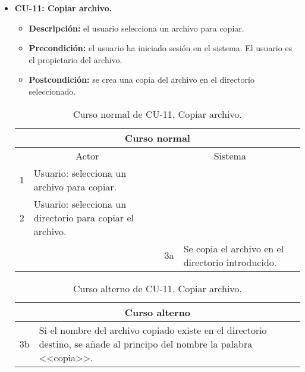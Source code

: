 \begin{itemize}
	\item \textbf{CU-11: Copiar archivo.}
	\begin{itemize}
		\item \textbf{Descripción:} el usuario selecciona un archivo para copiar.
		\item \textbf{Precondición:} el usuario ha iniciado sesión en el sistema. El usuario es el propietario del archivo.
		\item \textbf{Postcondición:} se crea una copia del archivo en el directorio seleccionado.
	\end{itemize}
	\begin{table}[H]
		\centering
		\begin{tabular}{|p{0.3cm}|p{5cm}|p{0.3cm}|p{5cm}|}
			\hline
			\multicolumn{4}{|c|}{Curso normal} \\ \hline
			\multicolumn{2}{|c|}{Actor} & \multicolumn{2}{|c|}{Sistema} \\ \hline
			1 & Usuario: selecciona un archivo para copiar. &  &  \\ \hline
			2 & Usuario: selecciona un directorio para copiar el archivo. &  &  \\ \hline
			&  & 3a & Se copia el archivo en el directorio introducido. \\ \hline
		\end{tabular}
		\caption{Curso normal de CU-11. Copiar archivo.}
		\label{tabla:cu11-normal}
	\end{table}
	
	\begin{table}[H]
		\centering
		\begin{tabular}{|p{0.3cm}|p{10cm}|}
			\hline
			\multicolumn{2}{|c|}{Curso alterno} \\ \hline
			3b & Si el nombre del archivo copiado existe en el directorio destino, se añade al principo del nombre la palabra <<copia>>. \\ \hline
		\end{tabular}
		\caption{Curso alterno de CU-11. Copiar archivo.}
		\label{tabla:cu11-alterno}
	\end{table}
\end{itemize}

